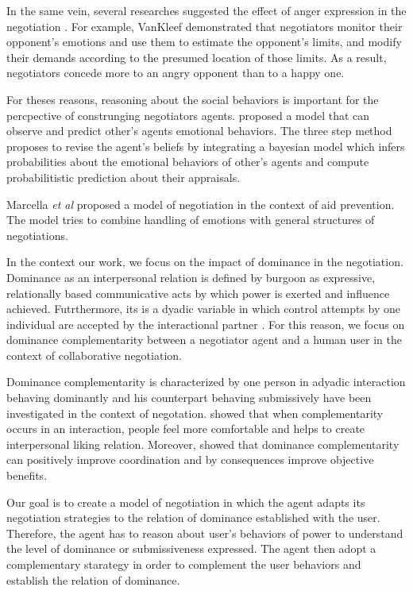 \documentclass[sigconf]{aamas}  %
\begin{document}
	In the same vein, several researches suggested the effect of anger expression in the negotiation \cite{sinaceur2006get,van2010interpersonal,ferguson2004social}. For example, VanKleef \cite{van2004interpersonal} demonstrated that negotiators monitor their opponent's emotions and use them to estimate the opponent's limits, and modify their demands according to the presumed location of those limits. As a result, negotiators concede more to an angry opponent than to a happy one. 
	
	
	For theses reasons, reasoning about the social behaviors is important for the percpective of construnging negotiators agents. \cite{alfonso2015emotional} proposed a model that can observe and predict other's agents emotional behaviors. The three step method proposes to revise the agent's  beliefs by integrating a bayesian model which infers probabilities about the emotional behaviors of other's agents and compute probabilitistic prediction about their appraisals.
	
	Marcella \textit{et al} \cite{klatt2011negotiations} proposed a model of negotiation in the context of aid prevention. The model tries to combine handling of emotions with general structures of negotiations. 
	
	In the context our work, we focus on the impact of dominance in the negotiation. Dominance as an interpersonal relation is defined by burgoon \cite{burgoon1998nature} as expressive, relationally based communicative acts by which power is exerted and influence achieved. Futrthermore, its is a dyadic variable in which control attempts by one individual are accepted by the
	interactional partner \cite{dunbar2005perceptions}. For this reason, we focus on dominance complementarity between a negotiator agent and a human user in the context of collaborative negotiation. 
	
	Dominance complementarity is characterized by one person in adyadic interaction behaving dominantly and his counterpart behaving submissively \cite{tiedens2003power} have been investigated in the context of negotation. \cite{tiedens2003power} showed that when complementarity occurs in an interaction, people feel more comfortable and helps to create interpersonal liking relation.
	Moreover, \cite{wiltermuth2015benefits} showed that dominance complementarity can positively improve coordination and by consequences improve objective benefits.
	
	Our goal is to create a model of negotiation in which the agent adapts its negotiation strategies to the relation of dominance established with the user. Therefore, the agent has to reason about user's behaviors of power  to understand the level of dominance or submissiveness expressed. The agent then adopt a complementary starategy in order to complement the user behaviors and establish the relation of dominance.
	
\end{document}
